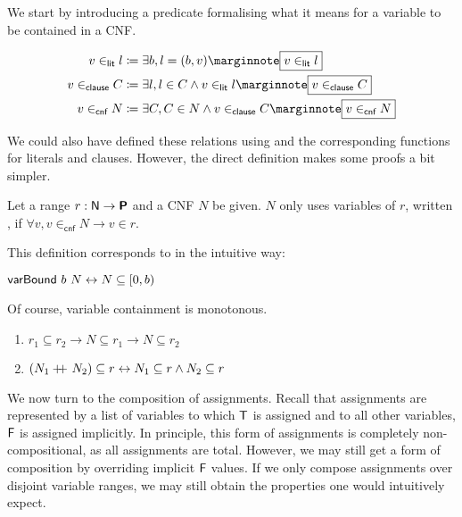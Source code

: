 We start by introducing a predicate formalising what it means for a variable to be contained in a CNF.
\newcommand{\inlit}{\ensuremath{\in_{\textsf{lit}}}}
\newcommand{\inclause}{\ensuremath{\in_{\textsf{clause}}}}
\newcommand{\incnf}{\ensuremath{\in_{\textsf{cnf}}}}

\begin{align*}
  v \inlit l &\defeq \exists b, l = (b, v) \mnote{$v \inlit{} l$}\\
  v \inclause C &\defeq \exists l, l \in C \land v \inlit l \mnote{$v \inclause{} C$}\\
  v \incnf N &\defeq \exists C, C \in N \land v \inclause C \mnote{$v \incnf{} N$}
\end{align*}

\begin{remark}
  We could also have defined these relations using \varsOfCnf{} and the corresponding functions for literals and clauses. However, the direct definition makes some proofs a bit simpler.
\end{remark}

\begin{definition}
  Let a range $r : \mathsf{N} \rightarrow \textsf{\bfseries P}$ and a CNF $N$ be given. 
  $N$ only uses variables of $r$, written , if $\forall v, v \incnf N \rightarrow v \in r$. 
\end{definition}

This definition corresponds to \varBound{} in the intuitive way:
\begin{fact}
  $\textsf{varBound}{}~b~N \leftrightarrow N \subseteq [0, b)$
\end{fact}

Of course, variable containment is monotonous. 
\begin{proposition}\label{prop:var_contain}\leavevmode
  \begin{enumerate}
    \item $r_1 \subseteq r_2 \rightarrow N \subseteq r_1 \rightarrow N \subseteq r_2$
    \item $(N_1 +\kern-1.3ex+\kern0.8ex N_2) \subseteq r \leftrightarrow N_1 \subseteq r \land N_2 \subseteq r$
  \end{enumerate}
\end{proposition}


We now turn to the composition of assignments. Recall that assignments are represented by a list of variables to which $\mathsf{T}$ is assigned and to all other variables, $\mathsf{F}$ is assigned implicitly. 
In principle, this form of assignments is completely non-compositional, as all assignments are total. 
However, we may still get a form of composition by overriding implicit $\mathsf{F}$ values. If we only compose assignments over disjoint variable ranges, we may still obtain the properties one would intuitively expect. 

